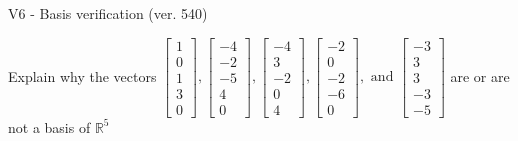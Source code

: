 \begin{exercise}
  \begin{exerciseTitle}V6 - Basis verification (ver. 540)\end{exerciseTitle}
  \begin{exerciseStatement}
    Explain why the vectors \(\left[\begin{array}{r}
1 \\
0 \\
1 \\
3 \\
0
\end{array}\right] , \left[\begin{array}{r}
-4 \\
-2 \\
-5 \\
4 \\
0
\end{array}\right] , \left[\begin{array}{r}
-4 \\
3 \\
-2 \\
0 \\
4
\end{array}\right] , \left[\begin{array}{r}
-2 \\
0 \\
-2 \\
-6 \\
0
\end{array}\right] , \text{ and } \left[\begin{array}{r}
-3 \\
3 \\
3 \\
-3 \\
-5
\end{array}\right]\) are or are not a basis of \(\mathbb{R}^5\)	



\end{exerciseStatement}
\end{exercise}
